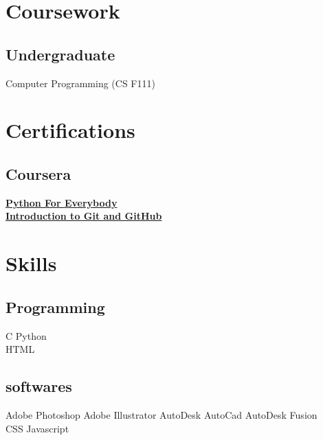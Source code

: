 \documentclass[]{deedy-resume-openfont}
\begin{document}
\begin{minipage}[t]{0.33\textwidth}

\section{Coursework}
\subsection{Undergraduate}
Computer Programming (CS F111) \\
\section{Certifications}
\subsection{Coursera}
\href{https://coursera.org/share/6d3557288f40c3aeb3cf7c94c4116a4f}{\bf Python For Everybody} \\
\href{https://coursera.org/share/bda0d4cd540a01c0d4965a522051c9ba}{\bf Introduction to Git and GitHub} \\



\section{Skills}
\subsection{Programming}
C \textbullet{} Python  \textbullet{} \\
HTML\\ 
\subsection{softwares}
Adobe Photoshop \textbullet{} Adobe Illustrator \textbullet{} AutoDesk AutoCad \textbullet{} AutoDesk Fusion \\
CSS \textbullet{} Javascript \\
\sectionsep

%
%

\end{minipage} 
\hfill
\end{document}
